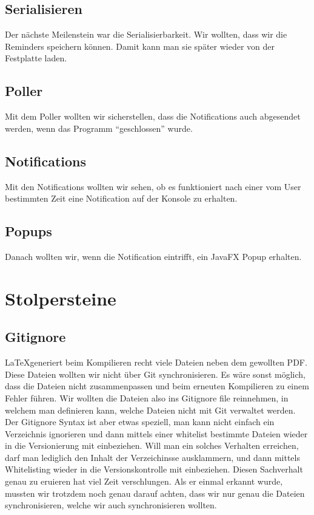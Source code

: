 \documentclass[11pt,titelpage]{scrartcl}
\begin{document}
\subsection{Serialisieren}
Der nächste Meilenstein war die Serialisierbarkeit. Wir wollten, dass wir die Reminders speichern können. Damit kann man sie später wieder von der Festplatte laden.
\subsection{Poller}
Mit dem Poller wollten wir sicherstellen, dass die Notifications auch abgesendet werden, wenn das Programm ``geschlossen'' wurde.
\subsection{Notifications}
Mit den Notifications wollten wir sehen, ob es funktioniert nach einer vom User bestimmten Zeit eine Notification auf der Konsole zu erhalten.
\subsection{Popups}
Danach wollten wir, wenn die Notification eintrifft, ein JavaFX Popup erhalten.
\section{Stolpersteine}
\subsection{Gitignore}
\LaTeX generiert beim Kompilieren recht viele Dateien neben dem gewollten PDF. Diese Dateien wollten wir nicht über Git synchronisieren. Es wäre sonst möglich, dass die
Dateien nicht zusammenpassen und beim erneuten Kompilieren zu einem Fehler führen. Wir wollten die Dateien also ins Gitignore file reinnehmen, in welchem man definieren kann,
welche Dateien nicht mit Git verwaltet werden. Der Gitignore Syntax ist aber etwas speziell, man kann nicht einfach ein Verzeichnis ignorieren und dann mittels einer whitelist
bestimmte Dateien wieder in die Versionierung mit einbeziehen. Will man ein solches Verhalten erreichen, darf man lediglich den Inhalt der Verzeichinsse ausklammern, und dann
mittels Whitelisting wieder in die Versionskontrolle mit einbeziehen. Diesen Sachverhalt genau zu eruieren hat viel Zeit verschlungen. Als er einmal erkannt wurde,
mussten wir trotzdem noch genau darauf achten, dass wir nur genau die Dateien synchronisieren, welche wir auch synchronisieren wollten.
\end{document}

